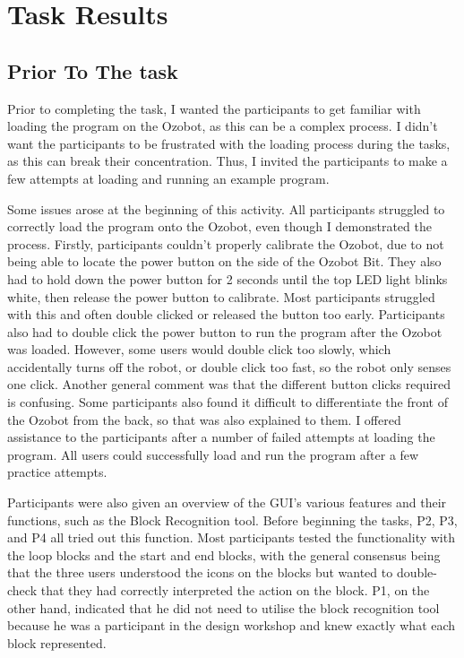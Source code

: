 \documentclass[oneside,%
                    author={Malak Hajji},
                    degree={BSc},
                    title={Designing An Accessible Ozobot Programming Platform for Students},
                  subtitle={With Mixed Visual Abilities}]{dissertation}
\begin{document}
\section{Task Results}
\label{beforetask}
\subsection{Prior To The task}

Prior to completing the task, I wanted the participants to get familiar with loading the program on the Ozobot, as this can be a complex process. I didn't want the participants to be frustrated with the loading process during the tasks, as this can break their concentration. Thus, I invited the participants to make a few attempts at loading and running an example program. 

Some issues arose at the beginning of this activity. All participants struggled to correctly load the program onto the Ozobot, even though I demonstrated the process. Firstly, participants couldn't properly calibrate the Ozobot, due to not being able to locate the power button on the side of the Ozobot Bit. They also had to hold down the power button for 2 seconds until the top LED light blinks white, then release the power button to calibrate. Most participants struggled with this and often double clicked or released the button too early. Participants also had to double click the power button to run the program after the Ozobot was loaded. However, some users would double click too slowly, which accidentally turns off the robot, or double click too fast, so the robot only senses one click. Another general comment was that the different button clicks required is confusing. Some participants also found it difficult to differentiate the front of the Ozobot from the back, so that was also explained to them. I offered assistance to the participants after a number of failed attempts at loading the program. All users could successfully load and run the program after a few practice attempts. 

Participants were also given an overview of the GUI's various features and their functions, such as the Block Recognition tool. Before beginning the tasks, P2, P3, and P4 all tried out this function. Most participants tested the functionality with the loop blocks and the start and end blocks, with the general consensus being that the three users understood the icons on the blocks but wanted to double-check that they had correctly interpreted the action on the block. P1, on the other hand, indicated that he did not need to utilise the block recognition tool because he was a participant in the design workshop and knew exactly what each block represented.
\end{document}
